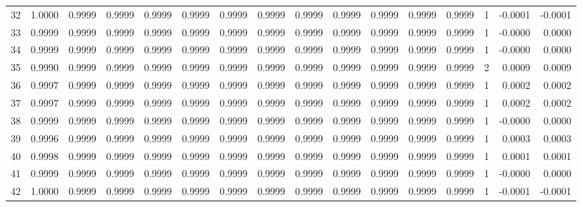 \begin{tabular}{lrrrrrrrrrrrrrrr}
32  &      1.0000 &  0.9999 &  0.9999 &  0.9999 &  0.9999 &  0.9999 &  0.9999 &  0.9999 &  0.9999 &  0.9999 &   0.9999 &     0.9999 &      1 &                   -0.0001 &                    -0.0001 \\
33  &      0.9999 &  0.9999 &  0.9999 &  0.9999 &  0.9999 &  0.9999 &  0.9999 &  0.9999 &  0.9999 &  0.9999 &   0.9999 &     0.9999 &      1 &                   -0.0000 &                     0.0000 \\
34  &      0.9999 &  0.9999 &  0.9999 &  0.9999 &  0.9999 &  0.9999 &  0.9999 &  0.9999 &  0.9999 &  0.9999 &   0.9999 &     0.9999 &      1 &                   -0.0000 &                     0.0000 \\
35  &      0.9990 &  0.9999 &  0.9999 &  0.9999 &  0.9999 &  0.9999 &  0.9999 &  0.9999 &  0.9999 &  0.9999 &   0.9999 &     0.9999 &      2 &                    0.0009 &                     0.0009 \\
36  &      0.9997 &  0.9999 &  0.9999 &  0.9999 &  0.9999 &  0.9999 &  0.9999 &  0.9999 &  0.9999 &  0.9999 &   0.9999 &     0.9999 &      1 &                    0.0002 &                     0.0002 \\
37  &      0.9997 &  0.9999 &  0.9999 &  0.9999 &  0.9999 &  0.9999 &  0.9999 &  0.9999 &  0.9999 &  0.9999 &   0.9999 &     0.9999 &      1 &                    0.0002 &                     0.0002 \\
38  &      0.9999 &  0.9999 &  0.9999 &  0.9999 &  0.9999 &  0.9999 &  0.9999 &  0.9999 &  0.9999 &  0.9999 &   0.9999 &     0.9999 &      1 &                   -0.0000 &                     0.0000 \\
39  &      0.9996 &  0.9999 &  0.9999 &  0.9999 &  0.9999 &  0.9999 &  0.9999 &  0.9999 &  0.9999 &  0.9999 &   0.9999 &     0.9999 &      1 &                    0.0003 &                     0.0003 \\
40  &      0.9998 &  0.9999 &  0.9999 &  0.9999 &  0.9999 &  0.9999 &  0.9999 &  0.9999 &  0.9999 &  0.9999 &   0.9999 &     0.9999 &      1 &                    0.0001 &                     0.0001 \\
41  &      0.9999 &  0.9999 &  0.9999 &  0.9999 &  0.9999 &  0.9999 &  0.9999 &  0.9999 &  0.9999 &  0.9999 &   0.9999 &     0.9999 &      1 &                   -0.0000 &                     0.0000 \\
42  &      1.0000 &  0.9999 &  0.9999 &  0.9999 &  0.9999 &  0.9999 &  0.9999 &  0.9999 &  0.9999 &  0.9999 &   0.9999 &     0.9999 &      1 &                   -0.0001 &                    -0.0001 \\

\end{tabular}
